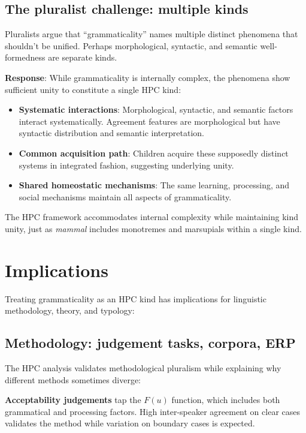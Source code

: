 \documentclass[12pt]{article}
\begin{document}
\subsection{The pluralist challenge: multiple kinds}

Pluralists argue that \enquote{grammaticality} names multiple distinct phenomena that shouldn't be unified. Perhaps morphological, syntactic, and semantic well-formedness are separate kinds.

\textbf{Response}: While grammaticality is internally complex, the phenomena show sufficient unity to constitute a single HPC kind:

\begin{itemize}
\item\textbf{Systematic interactions}: Morphological, syntactic, and semantic factors interact systematically. Agreement features are morphological but have syntactic distribution and semantic interpretation.

\item\textbf{Common acquisition path}: Children acquire these supposedly distinct systems in integrated fashion, suggesting underlying unity.

\item\textbf{Shared homeostatic mechanisms}: The same learning, processing, and social mechanisms maintain all aspects of grammaticality.
\end{itemize}
The HPC framework accommodates internal complexity while maintaining kind unity, just as \textit{mammal} includes monotremes and marsupials within a single kind.

\section{Implications}

Treating grammaticality as an HPC kind has implications for linguistic methodology, theory, and typology:

\subsection{Methodology: judgement tasks, corpora, ERP}

The HPC analysis validates methodological pluralism while explaining why different methods sometimes diverge:

\textbf{Acceptability judgements} tap the $F(u)$ function, which includes both grammatical and processing factors. High inter-speaker agreement on clear cases validates the method while variation on boundary cases is expected.
\end{document}
